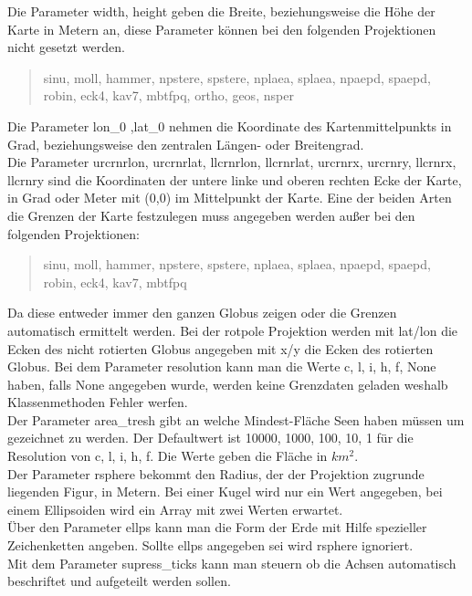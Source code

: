 Die Parameter \textsf{width, height} geben die Breite, beziehungsweise die Höhe der Karte in Metern an,
diese Parameter können bei den folgenden Projektionen nicht gesetzt werden.
\begin{verse}
\textsf{sinu, moll, hammer, npstere, spstere, nplaea, splaea, npaepd, spaepd, robin, eck4, kav7, mbtfpq, ortho, geos, nsper}
\end{verse}
Die Parameter \textsf{lon\_0 ,lat\_0 } nehmen die Koordinate des Kartenmittelpunkts in Grad, beziehungsweise den zentralen Längen- oder Breitengrad.\\
Die Parameter \textsf{urcrnrlon, urcrnrlat, llcrnrlon, llcrnrlat, urcrnrx, urcrnry, llcrnrx, llcrnry} sind die Koordinaten der untere linke und oberen rechten Ecke der Karte, in Grad oder Meter mit (0,0) im Mittelpunkt der Karte. Eine der beiden Arten die Grenzen der Karte festzulegen muss angegeben werden außer bei den folgenden Projektionen:\\
\begin{verse}
\textsf{sinu, moll, hammer, npstere, spstere, nplaea, splaea, npaepd, spaepd, robin, eck4, kav7, mbtfpq}
\end{verse}
Da diese entweder immer den ganzen Globus zeigen oder die Grenzen automatisch ermittelt werden.
Bei der \textsf{rotpole} Projektion werden mit lat/lon die Ecken des nicht rotierten Globus angegeben mit x/y die Ecken des rotierten Globus.
Bei dem Parameter \textsf{resolution} kann man die Werte \textsf{c, l, i, h, f, None} haben, falls \textsf{None} angegeben wurde, werden keine Grenzdaten geladen weshalb Klassenmethoden Fehler werfen.\\
 Der Parameter \textsf{area\_tresh} gibt an welche Mindest-Fläche Seen haben müssen um gezeichnet zu werden. Der Defaultwert ist 10000, 1000, 100, 10, 1 für die Resolution von c, l, i, h, f. Die Werte geben die Fläche in $km^2$.\\
 Der Parameter \textsf{rsphere} bekommt den Radius, der der Projektion zugrunde liegenden Figur, in Metern.
 Bei einer Kugel wird nur ein Wert angegeben, bei einem Ellipsoiden wird ein Array mit zwei Werten erwartet.\\
 Über den Parameter \textsf{ellps} kann man die Form der Erde mit Hilfe spezieller Zeichenketten angeben.
 Sollte \textsf{ellps} angegeben sei wird \textsf{rsphere} ignoriert.\\
 Mit dem Parameter \textsf{supress\_ticks} kann man steuern ob die Achsen automatisch beschriftet und aufgeteilt werden sollen.\\
